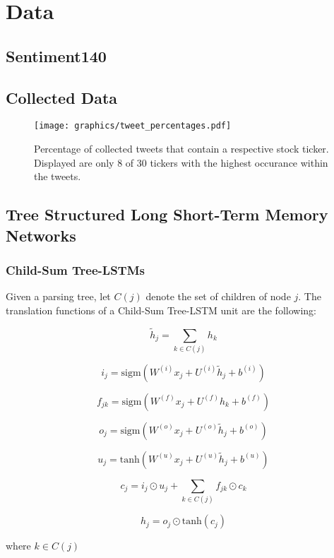 \documentclass[a4paper,12pt]{article}%
\begin{document}
\section{Data}
\subsection{Sentiment140}

\subsection{Collected Data}

\begin{figure}[H]
\captionsetup{justification=centering}
\centering
\texttt{[image: graphics/tweet\_percentages.pdf]}
\caption{Percentage of collected tweets that contain a respective stock ticker. Displayed are only 8 of 30 tickers with the highest occurance within the tweets. \label{fig:tweet_percentages}}
\end{figure}



\subsection{Tree Structured Long Short-Term Memory Networks}


\subsubsection{Child-Sum Tree-LSTMs}
Given a parsing tree, let $C(j)$ denote the set of children of node $j$. The translation functions of a Child-Sum Tree-LSTM unit are the following:

$$
\tilde{h}_j = \sum_{k \in C(j)} h_k
$$

$$
i_j = \text{sigm} \left( W^{(i)} x_j + U^{(i)} \tilde{h}_j + b^{(i)} \right) 
$$

$$
f_{jk} = \text{sigm} \left( W^{(f)} x_j + U^{(f)} h_k + b^{(f)} \right) 
$$

$$
o_j = \text{sigm} \left( W^{(o)} x_j + U^{(o)} \tilde{h}_j + b^{(o)} \right) 
$$

$$
u_j = \text{tanh} \left( W^{(u)} x_j + U^{(u)} \tilde{h}_j + b^{(u)} \right) 
$$

$$
c_j = i_j \odot u_j + \sum_{k \in C(j)} f_{jk} \odot c_k
$$

$$
h_j = o_j \odot \text{tanh}(c_j)
$$

where $k \in C(j)$
\end{document}

